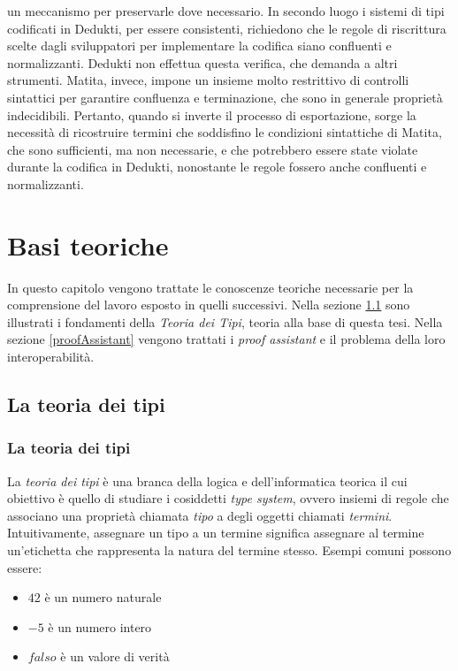 \documentclass[12pt,a4paper]{mimosis}
\begin{document}
un meccanismo per preservarle dove necessario. In secondo luogo i sistemi di tipi
codificati in Dedukti, per essere consistenti, richiedono che le regole di riscrittura
scelte dagli sviluppatori per implementare la codifica siano confluenti e normalizzanti.
Dedukti non effettua questa verifica, che demanda a altri strumenti. Matita, invece, impone
un insieme molto restrittivo di controlli sintattici per garantire confluenza e terminazione,
che sono in generale proprietà indecidibili. Pertanto, quando si inverte il processo di
esportazione, sorge la necessità di ricostruire termini che soddisfino le condizioni 
sintattiche di Matita, che sono sufficienti, ma non necessarie, e che potrebbero essere
state violate durante la codifica in Dedukti, nonostante le regole fossero anche confluenti
e normalizzanti.

\chapter{Basi teoriche}
In questo capitolo vengono trattate le conoscenze teoriche necessarie per la
comprensione del lavoro esposto in quelli successivi. Nella sezione \ref{teoriaDeiTipi}
sono illustrati i fondamenti della \textit{Teoria dei Tipi}, teoria alla base 
di questa tesi. Nella sezione \ref{proofAssistant} vengono trattati i \textit{proof 
assistant} e il problema della loro interoperabilità.

\section{La teoria dei tipi} \label{teoriaDeiTipi}
\subsection{La teoria dei tipi}
La \textit{teoria dei tipi} è una branca della logica e dell'informatica teorica il
cui obiettivo è quello di studiare i cosiddetti \textit{type system}, ovvero
insiemi di regole che associano una proprietà chiamata \textit{tipo} a degli oggetti
chiamati \textit{termini}. Intuitivamente, assegnare un tipo a un termine significa
assegnare al termine un'etichetta che rappresenta la natura del termine stesso.
Esempi comuni possono essere: 
\begin{itemize}
  \item $42$ è un numero naturale 
  \item $-5$ è un numero intero
  \item $falso$ è un valore di verità 
\end{itemize}
\end{document}
